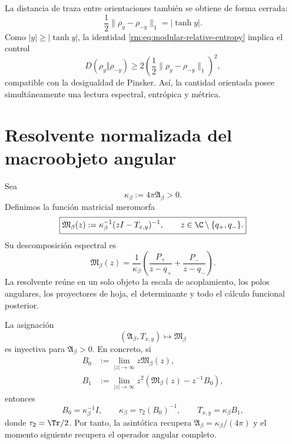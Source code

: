 La distancia de traza entre orientaciones tambi\'en se obtiene de forma
cerrada:
\begin{equation}
 \frac12\lVert\rho_y-\rho_{-y}\rVert_1=|\tanh y|.
 \label{rm:eq:modular-trace-distance}
\end{equation}
Como \(|y|\geq|\tanh y|\), la identidad
\cref{rm:eq:modular-relative-entropy} implica el control
\begin{equation}
 D(\rho_y\Vert\rho_{-y})
 \geq 2\left(\frac12
 \lVert\rho_y-\rho_{-y}\rVert_1\right)^2,
 \label{rm:eq:modular-pinsker-exact-control}
\end{equation}
compatible con la desigualdad de Pinsker. As\'i, la cantidad orientada posee
simult\'aneamente una lectura espectral, entr\'opica y m\'etrica.

\section{Resolvente normalizada del macroobjeto angular}

Sea
\begin{equation}
 \kappa_\beta:=4\pi\mathfrak A_\beta>0.
 \label{rm:eq:modular-kappa-beta}
\end{equation}
Definimos la funci\'on matricial meromorfa
\begin{equation}
 \boxed{
 \mathfrak M_\beta(z)
 :=\kappa_\beta^{-1}(zI-T_{x,y})^{-1},
 \qquad
 z\in\C\setminus\{q_+,q_-\}.}
 \label{rm:eq:modular-resolvent}
\end{equation}
Su descomposici\'on espectral es
\begin{equation}
 \mathfrak M_\beta(z)
 =\frac1{\kappa_\beta}
 \left(\frac{P_+}{z-q_+}+\frac{P_-}{z-q_-}\right).
 \label{rm:eq:modular-resolvent-spectral}
\end{equation}
La resolvente re\'une en un solo objeto la escala de acoplamiento, los polos
angulares, los proyectores de hoja, el determinante y todo el c\'alculo
funcional posterior.

\begin{theorem}
\label{rm:thm:modular-resolvent-injective}
La asignaci\'on
\[
 (\mathfrak A_\beta,T_{x,y})
 \longmapsto\mathfrak M_\beta
\]
es inyectiva para \(\mathfrak A_\beta>0\). En concreto, si
\begin{align}
 B_0&:=\lim_{|z|\to\infty}z\mathfrak M_\beta(z),
 \label{rm:eq:modular-B0}\\
 B_1&:=\lim_{|z|\to\infty}z^2
 \left(\mathfrak M_\beta(z)-z^{-1}B_0\right),
 \label{rm:eq:modular-B1}
\end{align}
entonces
\begin{equation}
 B_0=\kappa_\beta^{-1}I,
 \qquad
 \kappa_\beta=\tau_2(B_0)^{-1},
 \qquad
 T_{x,y}=\kappa_\beta B_1,
 \label{rm:eq:modular-reconstruct-kappa-T}
\end{equation}
donde \(\tau_2=\Tr/2\). Por tanto, la asint\'otica recupera
\(\mathfrak A_\beta=\kappa_\beta/(4\pi)\) y el momento siguiente recupera
el operador angular completo.
\end{theorem}

